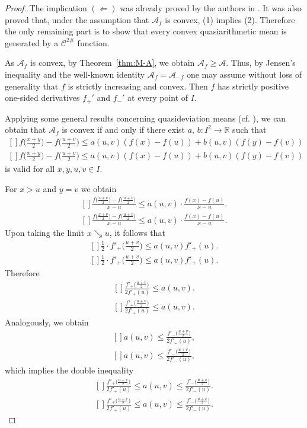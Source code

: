 \documentclass[12pt,oneside]{amsart}
\theoremstyle{definition}
\numberwithin{equation}{section}
\def\Eq#1#2{\ifthenelse{\equal{#1}{*}}
  {\begin{equation*}\begin{aligned}[]#2\end{aligned}\end{equation*}}
  {\begin{equation}\begin{aligned}[]\label{#1}#2\end{aligned}\end{equation}}}
\def\A{\mathscr{A}}
\def\Cts{\mathcal{C}^{2\#}}
\newcommand\R{\mathbb{R}}
\newcommand{\QA}[1]{\A_{#1}}
\begin{document}
\begin{proof}
The implication $(\Leftarrow)$ was already proved by the authors in \cite{PalPas18a}. It was also proved that, under the assumption that $\QA{f}$ is convex, (1) implies (2). Therefore the only remaining part is to show that every convex quasiarithmetic mean is generated by a $\Cts$ function.

As $\QA{f}$ is convex, by Theorem~\ref{thm:M-A}, we obtain $\QA{f} \ge \A$. Thus, by Jensen's inequality and the well-known identity $\QA{f}=\QA{-f}$ one may assume without loss of generality that $f$ is strictly increasing and convex. Then $f$ has strictly positive one-sided derivatives $f_+'$ and $f_-'$ at every point of $I$.

Applying some general results concerning quasideviation means (cf. \cite{Pal88a}), we can obtain that $\QA{f}$ is convex if and only if
there exist $a,\,b \colon I^2 \to \R$ such that
\Eq{E:condC}{
f\big( \tfrac{x+y}2\big)-f\big( \tfrac{u+v}2\big)\le a(u,v) (f(x)-f(u)) + b(u,v) (f(y)-f(v))
}
is valid for all $x,y,u,v \in I$.

For $x>u$ and $y=v$ we obtain
\Eq{*}{
\frac{f\big( \frac{x+v}2\big)-f\big( \frac{u+v}2\big)}{x-u} \le 
a(u,v) \cdot \frac{f(x)-f(u)}{x-u}.
}
Upon taking the limit $x \searrow u$, it follows that  
\Eq{*}{
\tfrac12 \cdot f'_+ \big( \tfrac{u+v}2\big) \le a(u,v) f'_+(u).
}
Therefore
\Eq{*}{
\frac{f'_+ \big( \frac{u+v}2\big)}{2f'_+(u)}\leq a(u,v).
}
Analogously, we obtain
\Eq{*}{
a(u,v) \le \frac{f'_- \big( \frac{u+v}2\big)}{2f'_-(u)},
}
which implies the double inequality
\Eq{E:DI}{
\frac{f'_+ \big( \frac{u+v}2\big)}{2f'_+(u)} \le a(u,v) \le \frac{f'_- \big( \frac{u+v}2\big)}{2f'_-(u)}.
}


\end{proof}
\end{document}
